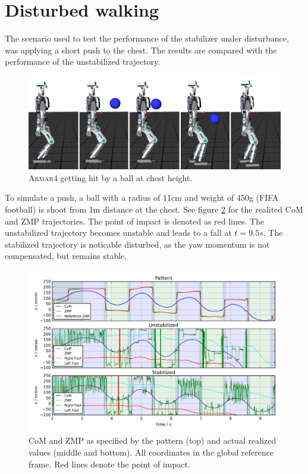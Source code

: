 \documentclass[english,ngerman]{KITreprt}
\newcommand{\name}[1]{\textsc{#1}}
\begin{document}
\section{Disturbed walking}\label{disturbed-walking}

The scenario used to test the performance of the stabilizer under
disturbance, was applying a short push to the chest. The results are
compared with the performance of the unstabilized trajectory.

\begin{figure}[hbt]
\vspace*{-1em}
\includegraphics[width=\textwidth,resolution=300]{images/disturbed_straight_thumbs.png}
\caption{\name{Armar4} getting hit by a ball at chest height.}
\label{img:player-undisturbed-circle-thumbs}
\end{figure}

To simulate a push, a ball with a radius of 11cm and weight of 450g
(FIFA football) is shoot from 1m distance at the chest. See figure
\ref{img:disturbed-straight-x} for the realited CoM and ZMP
trajectories. The point of impact is denoted as red lines. The
unstabilized trajectory becomes unstable and leads to a fall at
$t = 9.5s$. The stabilized trajectory is noticable disturbed, as the yaw
momentum is not compensated, but remains stable.

\begin{figure}[hbt]
\vspace*{-1em}
\includegraphics[width=\textwidth,resolution=300]{images/disturbed_straight_x.png}
\caption{CoM and ZMP as specified by the pattern (top) and actual realized values (middle and bottom).
All coordinates in the global reference frame. Red lines denote the point of impact.}
\label{img:disturbed-straight-x}
\end{figure}
\end{document}
